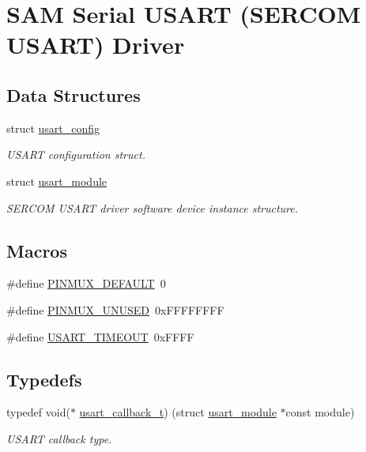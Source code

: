 \hypertarget{group__asfdoc__sam0__sercom__usart__group}{}\section{S\+AM Serial U\+S\+A\+RT (S\+E\+R\+C\+OM U\+S\+A\+RT) Driver}
\label{group__asfdoc__sam0__sercom__usart__group}
\subsection*{Data Structures}
\begin{DoxyCompactItemize}
\item 
struct \mbox{\hyperlink{structusart__config}{usart\+\_\+config}}
\begin{DoxyCompactList}\small\item\em U\+S\+A\+RT configuration struct. \end{DoxyCompactList}\item 
struct \mbox{\hyperlink{structusart__module}{usart\+\_\+module}}
\begin{DoxyCompactList}\small\item\em S\+E\+R\+C\+OM U\+S\+A\+RT driver software device instance structure. \end{DoxyCompactList}\end{DoxyCompactItemize}
\subsection*{Macros}
\begin{DoxyCompactItemize}
\item 
\#define \mbox{\hyperlink{group__asfdoc__sam0__sercom__usart__group_gae7bc85650aed61f97fe3d5df9b430456}{P\+I\+N\+M\+U\+X\+\_\+\+D\+E\+F\+A\+U\+LT}}~0
\item 
\#define \mbox{\hyperlink{group__asfdoc__sam0__sercom__usart__group_gaffde9ff712058ef836127e1f3368889e}{P\+I\+N\+M\+U\+X\+\_\+\+U\+N\+U\+S\+ED}}~0x\+F\+F\+F\+F\+F\+F\+FF
\item 
\#define \mbox{\hyperlink{group__asfdoc__sam0__sercom__usart__group_gad3e37fdd22ce059c9158a818d608447a}{U\+S\+A\+R\+T\+\_\+\+T\+I\+M\+E\+O\+UT}}~0x\+F\+F\+FF
\end{DoxyCompactItemize}
\subsection*{Typedefs}
\begin{DoxyCompactItemize}
\item 
typedef void($\ast$ \mbox{\hyperlink{group__asfdoc__sam0__sercom__usart__group_ga1d3e2901d0cf76f20aae271f7122c67d}{usart\+\_\+callback\+\_\+t}}) (struct \mbox{\hyperlink{structusart__module}{usart\+\_\+module}} $\ast$const module)
\begin{DoxyCompactList}\small\item\em U\+S\+A\+RT callback type. \end{DoxyCompactList}\end{DoxyCompactItemize}
